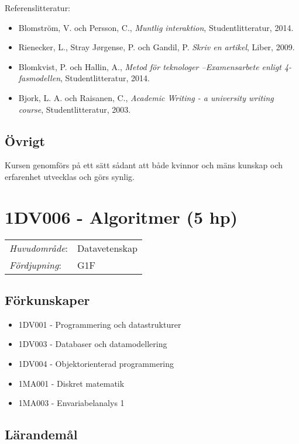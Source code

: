 Referenslitteratur:

\begin{itemize}
\tightlist
\item
  Blomström, V. och Persson, C., \emph{Muntlig interaktion},
  Studentlitteratur, 2014.
\item
  Rienecker, L., Stray Jørgense, P. och Gandil, P. \emph{Skriv en
  artikel}, Liber, 2009.
\item
  Blomkvist, P. och Hallin, A., \emph{Metod för teknologer
  --Examensarbete enligt 4-fasmodellen}, Studentlitteratur, 2014.
\item
  Bjork, L. A. och Raisanen, C., \emph{Academic Writing - a university
  writing course}, Studentlitteratur, 2003.
\end{itemize}

\subsection*{Övrigt}

Kursen genomförs på ett sätt sådant att både kvinnor och mäns kunskap och erfarenhet utvecklas och görs synlig.
\pagebreak
\section*{1DV006 - Algoritmer (5 hp)}

\begin{tabular}{ll}\emph{Huvudområde}: & Datavetenskap\tabularnewline\emph{Fördjupning}: & G1F\tabularnewline\end{tabular}

\subsection*{Förkunskaper}

\begin{itemize}
\tightlist
\item
  1DV001 - Programmering och datastrukturer
\item
  1DV003 - Databaser och datamodellering
\item
  1DV004 - Objektorienterad programmering
\item
  1MA001 - Diskret matematik
\item
  1MA003 - Envariabelanalys 1
\end{itemize}

\subsection*{Lärandemål}

